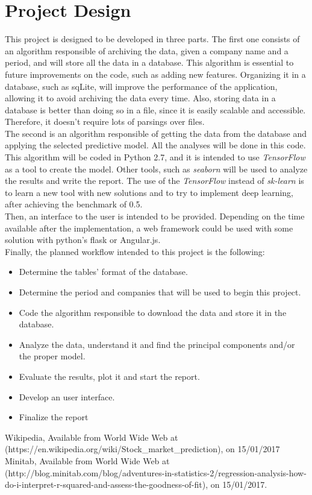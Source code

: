 \documentclass[a4paper, 11pt]{article}
\begin{document}
\section*{Project Design}
This project is designed to be developed in three parts. The first one consists of an algorithm responsible of archiving the data, given a company name and a period, and will store all the data in a database. This algorithm is essential to future improvements on the code, such as 
 adding new features. Organizing it in a database, such as sqLite, will improve the performance of the application, allowing it to avoid archiving the data every time. Also, storing data in a database is better
 than doing so in a file, since it is easily scalable and accessible. Therefore, it doesn't require lots of parsings over files.
 \newline
 \\
 The second is an algorithm responsible of getting the data from the database and applying the selected predictive model. All the analyses will be done in this code. This algorithm will be coded in Python 2.7,
 and it is intended to use \emph{TensorFlow} as a tool to create the model. Other tools, such as \emph{seaborn} will be used to analyze the results and write the report. The use of the \emph{TensorFlow} instead
 of \emph{sk-learn} is to learn a new tool with new solutions and to try to implement deep learning, after achieving the benchmark of 0.5.   
 \newline
 \\
 Then, an  interface to the user is intended to be provided. Depending on the time available after the implementation, a web framework could be used with  some solution with python's flask or Angular.js. 
 \newline
 \\
Finally, the planned workflow intended to this project is the following:
\begin{itemize}
 \item Determine the tables' format  of the database.
 \item Determine the period and companies that will be used to begin this project.
 \item Code the algorithm responsible to download the data and store it in the database.
 \item Analyze the data, understand it and find the principal components and/or the proper model.
 \item Evaluate the results, plot it and start the report.
 \item Develop an user interface.
 \item Finalize the report
\end{itemize}

\begin{thebibliography}{9}
 Wikipedia, Available from World Wide Web at (https://en.wikipedia.org/wiki/Stock\_market\_prediction), on 15/01/2017 
 Minitab, Available from World Wide Web at (http://blog.minitab.com/blog/adventures-in-statistics-2/regression-analysis-how-do-i-interpret-r-squared-and-assess-the-goodness-of-fit), on 15/01/2017.
\end{thebibliography}
\end{document}
